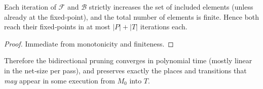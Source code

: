 	\begin{lemma}
		Each iteration of $\mathcal{F}$ and $\mathcal{B}$ strictly increases
		the set of included elements (unless already at the fixed‐point), and
		the total number of elements is finite.  Hence both reach their
		fixed‐points in at most $|P|+|T|$ iterations each.
	\end{lemma}
	
	\begin{proof}
		Immediate from monotonicity and finiteness.
	\end{proof}
	
	\noindent
	Therefore the bidirectional pruning converges in polynomial time
	(mostly linear in the net‐size per pass), and preserves exactly the
	places and transitions that \emph{may} appear in some execution from
	$M_0$ into $T$.
	


